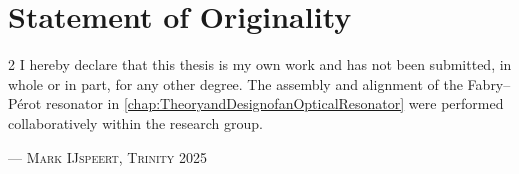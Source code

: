 \documentclass[../Thesis-IJspeert.tex]{subfiles}
\begin{document}
\cleardoublepage
\chapter*{Statement of Originality}
\thispagestyle{empty}
\begin{spacing}{2}
\begingroup
I hereby declare that this thesis is my own work and has not been submitted, in whole or in part, for any other degree. The assembly and alignment of the Fabry--Pérot resonator in \autoref{chap:TheoryandDesignofanOpticalResonator} were performed collaboratively within the research group.

\flushright
\textsc{— Mark IJspeert, Trinity 2025}\\
\vfill

\endgroup
\end{spacing}
\end{document}
